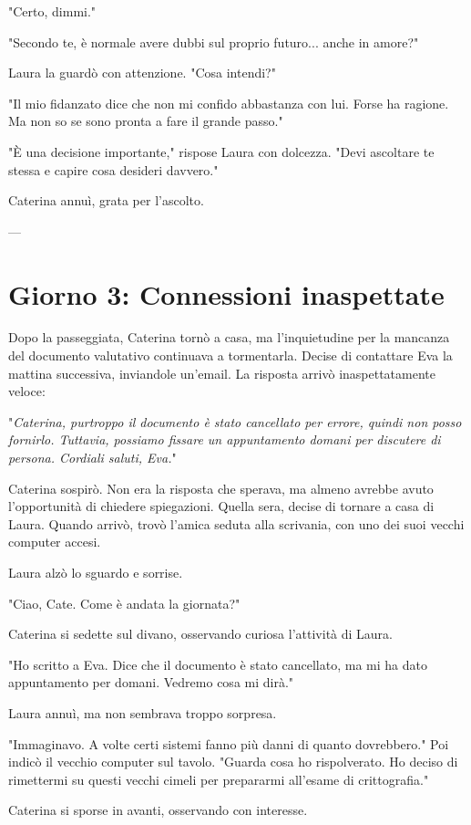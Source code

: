 "Certo, dimmi."

"Secondo te, è normale avere dubbi sul proprio futuro... anche in amore?"

Laura la guardò con attenzione. "Cosa intendi?"

"Il mio fidanzato dice che non mi confido abbastanza con lui. Forse ha ragione. Ma non so se sono pronta a fare il grande passo."

"È una decisione importante," rispose Laura con dolcezza. "Devi ascoltare te stessa e capire cosa desideri davvero."

Caterina annuì, grata per l'ascolto.

---

\chapter{Giorno 3: Connessioni inaspettate}

Dopo la passeggiata, Caterina tornò a casa, ma l'inquietudine per la mancanza del documento valutativo continuava a tormentarla. Decise di contattare Eva la mattina successiva, inviandole un'email. La risposta arrivò inaspettatamente veloce:

"\emph{Caterina, purtroppo il documento è stato cancellato per errore, quindi non posso fornirlo. Tuttavia, possiamo fissare un appuntamento domani per discutere di persona. Cordiali saluti, Eva.}"

Caterina sospirò. Non era la risposta che sperava, ma almeno avrebbe avuto l'opportunità di chiedere spiegazioni. Quella sera, decise di tornare a casa di Laura. Quando arrivò, trovò l’amica seduta alla scrivania, con uno dei suoi vecchi computer accesi.

Laura alzò lo sguardo e sorrise.

"Ciao, Cate. Come è andata la giornata?"

Caterina si sedette sul divano, osservando curiosa l’attività di Laura.

"Ho scritto a Eva. Dice che il documento è stato cancellato, ma mi ha dato appuntamento per domani. Vedremo cosa mi dirà."

Laura annuì, ma non sembrava troppo sorpresa.

"Immaginavo. A volte certi sistemi fanno più danni di quanto dovrebbero." Poi indicò il vecchio computer sul tavolo. "Guarda cosa ho rispolverato. Ho deciso di rimettermi su questi vecchi cimeli per prepararmi all'esame di crittografia."

Caterina si sporse in avanti, osservando con interesse.

